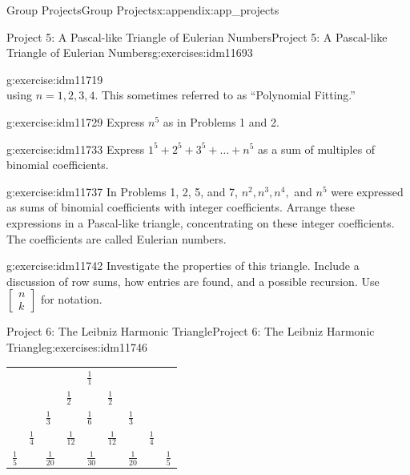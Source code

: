 \documentclass[oneside,10pt,]{book}
\numberwithin{equation}{chapter}
\begin{document}
\begin{appendixptx}{Group Projects}{}{Group Projects}{}{}{x:appendix:app_projects}
\begin{exercises-section-numberless}{Project 5: A Pascal-like Triangle of Eulerian Numbers}{}{Project 5: A Pascal-like Triangle of Eulerian Numbers}{}{}{g:exercises:idm11693}
\begin{divisionexercise}{7}{}{}{g:exercise:idm11719}
\begin{equation*}
\end{equation*}
using \(n=1, 2, 3, 4\). This sometimes referred to as ``Polynomial Fitting.''%
\end{divisionexercise}%
\begin{divisionexercise}{8}{}{}{g:exercise:idm11729}%
Express \(n^{5}\) as in Problems 1 and 2.%
\end{divisionexercise}%
\begin{divisionexercise}{9}{}{}{g:exercise:idm11733}%
Express \(1^{5} + 2^{5} + 3^{5} + \ldots + n^{5}\) as a sum of multiples of binomial coefficients.%
\end{divisionexercise}%
\begin{divisionexercise}{10}{}{}{g:exercise:idm11737}%
In Problems 1, 2, 5, and 7, \(n^{2},n^{3},n^{4},\) and \(n^{5}\) were expressed as sums of binomial coefficients with integer coefficients. Arrange these expressions in a Pascal-like triangle, concentrating on these integer coefficients. The coefficients are called Eulerian numbers.%
\end{divisionexercise}%
\begin{divisionexercise}{11}{}{}{g:exercise:idm11742}%
Investigate the properties of this triangle. Include a discussion of row sums, how entries are found, and a possible recursion. Use \(\begin{bmatrix}
n\\
k
\end{bmatrix}\) for notation.%
\end{divisionexercise}%
\end{exercises-section-numberless}
%
%
\typeout{************************************************}
\typeout{************************************************}
%
\begin{exercises-section-numberless}{Project 6: The Leibniz Harmonic Triangle}{}{Project 6: The Leibniz Harmonic Triangle}{}{}{g:exercises:idm11746}
\begin{sidebyside}{1}{0}{0}{0}%
\begin{sbspanel}{1}%
{\centering%
\begin{tabular}{lllllllll}
&&&&\(\frac{1}{1}\)&&&&\tabularnewline[0pt]
&&&\(\frac{1}{2}\)&&\(\frac{1}{2}\)&&&\tabularnewline[0pt]
&&\(\frac{1}{3}\)&&\(\frac{1}{6}\)&&\(\frac{1}{3}\)&&\tabularnewline[0pt]
&\(\frac{1}{4}\)&&\(\frac{1}{12}\)&&\(\frac{1}{12}\)&&\(\frac{1}{4}\)&\tabularnewline[0pt]
\(\frac{1}{5}\)&&\(\frac{1}{20}\)&&\(\frac{1}{30}\)&&\(\frac{1}{20}\)&&\(\frac{1}{5}\)
\end{tabular}
}
\end{sbspanel}
\end{sidebyside}
\end{exercises-section-numberless}
\end{appendixptx}
\end{document}
